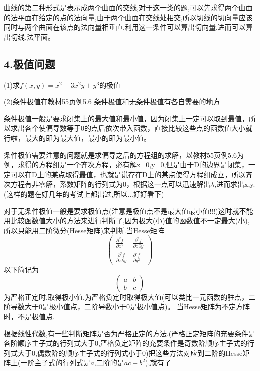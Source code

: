 \documentclass{ctexart}
\begin{document}
曲线的第二种形式是表示成两个曲面的交线,对于这一类的题,可以先求得两个曲面的法平面在给定的点的法向量,由于两个曲面在交线处相交,所以切线的切向量应该同时与两个曲面在该点的法向量相垂直,利用这一条件可以算出切向量,进而可以算出切线,法平面。

\subsection*{4.极值问题}

\noindent (1)求$f(x,y)=x^{2}-3x^{2}y+y^{3}$的极值

\noindent (2)条件极值在教材55页例5.6
\newline
\newline
条件极值和无条件极值有各自需要的地方

条件极值一般是要求闭集上的最大值和最小值，因为闭集上一定可以取到最值，所以求出各个使偏导数等于0的点后依次带入函数，直接比较这些点的函数值大小就行啦，最大的即为最大值，最小的即为最小值。

条件极值需要注意的问题就是求偏导之后的方程组的求解，以教材55页例5.6为例，求得的方程组是一个齐次方程，必有解x=0,y=0,但是由于D的边界是闭集，一定可以在D上的某点取得最值，也就是说存在D上的某点使得方程组成立，所以齐次方程有非零解，系数矩阵的行列式为0，根据这一点可以迅速解出$\lambda$,进而求出x,y.(这样的题在好几年的考试上都出过,所以...好好看下)

对于无条件极值一般是要求极值点(注意是极值点不是最大值最小值!!!)这时就不能用比较函数值大小的方法来进行判断了,因为极大(小)值的函数值不一定最大(小),所以只能用二阶微分(Hesse矩阵)来判断.当Hesse矩阵
\begin{equation}\nonumber
{
\left( \begin{array}{ccc}
\frac{\partial^{2}f}{\partial x^{2}}&  \frac{\partial^{2}f}{\partial x\partial y}\\
  \frac{\partial^{2}f}{\partial x\partial y} &\frac{\partial^{2}f}{\partial y^{2}}
\end{array}
\right )}
\end{equation}
以下简记为
\begin{equation}\nonumber
{
\left( \begin{array}{ccc}
a&b\\
 b&c
\end{array}
\right )}
\end{equation}
为严格正定时,取得极小值,为严格负定时取得极大值(可以类比一元函数的驻点，二阶导数大于0是极小值点，二阶导数小于0是极小值点)。
当Hesse矩阵为不定方阵时，不是极值点.


根据线性代数,有一些判断矩阵是否为严格正定的方法.(严格正定矩阵的充要条件是各阶顺序主子式的行列式大于0,严格负定矩阵的充要条件是奇数阶顺序主子式的行列式大于0,偶数阶的顺序主子式的行列式小于0)把这些方法对应到二阶的Hesse矩阵上(一阶主子式的行列式是$a$,二阶的是$ac-b^{2}$),就有了
\end{document}
